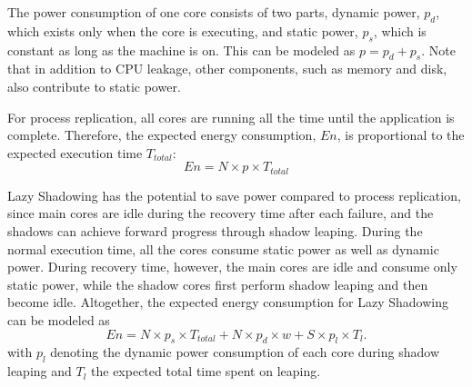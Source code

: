 The power consumption of one core consists of two parts, dynamic power, $p_d$, which exists only when the core is executing, and static power, $p_s$, which is constant as long as the machine is on. This can be modeled as $p = p_d + p_s$. Note that in addition to CPU leakage, other components, such as memory and disk, also contribute to static power. 

For process replication, all cores are running all the time until the application is complete. Therefore, the expected energy consumption, $En$, is proportional to the expected execution time $T_{total}$: 
\begin{equation}
En = N \times p \times T_{total}
\label{eq:exp_energy1}
\end{equation} 

Lazy Shadowing has the potential to save power compared to process replication, since main cores are idle during the recovery time after each failure, and the shadows can achieve forward progress through shadow leaping. During the normal execution time, all the cores consume static power as well as dynamic power. During recovery time, however, the main cores are idle and consume only static power, while the shadow cores first perform shadow leaping and then become idle. Altogether, the expected energy consumption for Lazy Shadowing can be modeled as 
\begin{equation}
En = N \times p_s \times T_{total} + N \times p_d \times w + S \times p_{l} \times T_l.
\label{eq:exp_energy2}
\end{equation}
with $p_{l}$ denoting the dynamic power consumption of each core during shadow leaping and $T_l$ the expected total time spent on leaping. %

